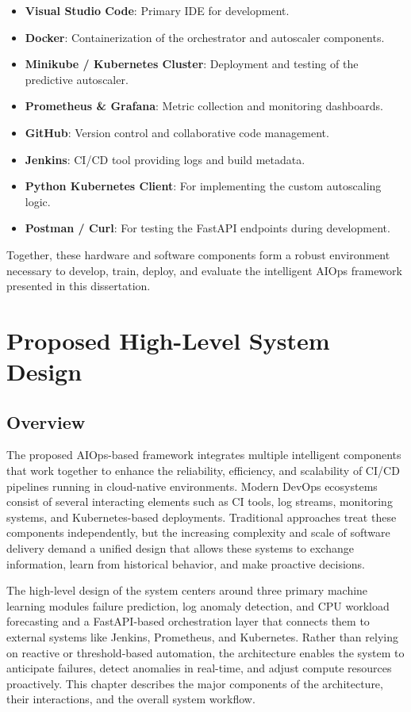 \documentclass[12pt]{report}
\begin{document}
\begin{itemize}
    \item \textbf{Visual Studio Code}: Primary IDE for development.
    \item \textbf{Docker}: Containerization of the orchestrator and autoscaler components.
    \item \textbf{Minikube / Kubernetes Cluster}: Deployment and testing of the predictive autoscaler.
    \item \textbf{Prometheus \& Grafana}: Metric collection and monitoring dashboards.
    \item \textbf{GitHub}: Version control and collaborative code management.
    \item \textbf{Jenkins}: CI/CD tool providing logs and build metadata.
    \item \textbf{Python Kubernetes Client}: For implementing the custom autoscaling logic.
    \item \textbf{Postman / Curl}: For testing the FastAPI endpoints during development.
\end{itemize}

\noindent
Together, these hardware and software components form a robust environment necessary to develop, train, deploy, and evaluate the intelligent AIOps framework presented in this dissertation.


\clearpage
\chapter{Proposed High-Level System Design}

\section{Overview}

The proposed AIOps-based framework integrates multiple intelligent components that work together to enhance the reliability, efficiency, and scalability of CI/CD pipelines running in cloud-native environments. Modern DevOps ecosystems consist of several interacting elements such as CI tools, log streams, monitoring systems, and Kubernetes-based deployments. Traditional approaches treat these components independently, but the increasing complexity and scale of software delivery demand a unified design that allows these systems to exchange information, learn from historical behavior, and make proactive decisions.

The high-level design of the system centers around three primary machine learning modules failure prediction, log anomaly detection, and CPU workload forecasting and a FastAPI-based orchestration layer that connects them to external systems like Jenkins, Prometheus, and Kubernetes. Rather than relying on reactive or threshold-based automation, the architecture enables the system to anticipate failures, detect anomalies in real-time, and adjust compute resources proactively. This chapter describes the major components of the architecture, their interactions, and the overall system workflow.
\end{document}
